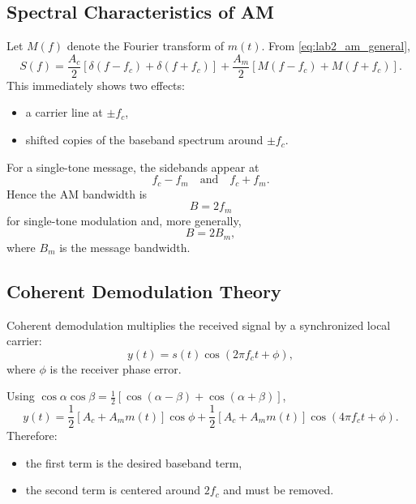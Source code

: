 \subsection{Spectral Characteristics of AM}

Let $M(f)$ denote the Fourier transform of $m(t)$. From
\eqref{eq:lab2_am_general},
\begin{equation}
S(f)=\frac{A_c}{2}\left[\delta(f-f_c)+\delta(f+f_c)\right]
+\frac{A_m}{2}\left[M(f-f_c)+M(f+f_c)\right].
\label{eq:lab2_am_spectrum_general}
\end{equation}
This immediately shows two effects:
\begin{itemize}
\item a carrier line at $\pm f_c$,
\item shifted copies of the baseband spectrum around $\pm f_c$.
\end{itemize}

For a single-tone message, the sidebands appear at
\begin{equation}
f_c-f_m \quad \text{and} \quad f_c+f_m.
\end{equation}
Hence the AM bandwidth is
\begin{equation}
B=2f_m
\end{equation}
for single-tone modulation and, more generally,
\begin{equation}
B=2B_m,
\end{equation}
where $B_m$ is the message bandwidth.

\subsection{Coherent Demodulation Theory}

Coherent demodulation multiplies the received signal by a synchronized local
carrier:
\begin{equation}
y(t)=s(t)\cos(2\pi f_c t+\phi),
\end{equation}
where $\phi$ is the receiver phase error.

Using $\cos\alpha\cos\beta=\tfrac{1}{2}[\cos(\alpha-\beta)+\cos(\alpha+\beta)]$,
\begin{equation}
y(t)=\frac{1}{2}\left[A_c+A_m m(t)\right]\cos\phi
+\frac{1}{2}\left[A_c+A_m m(t)\right]\cos(4\pi f_c t+\phi).
\label{eq:lab2_coherent_expand}
\end{equation}
Therefore:
\begin{itemize}
\item the first term is the desired baseband term,
\item the second term is centered around $2f_c$ and must be removed.
\end{itemize}

